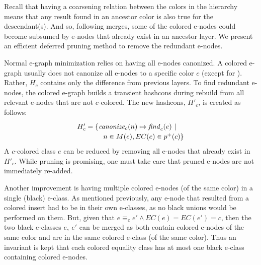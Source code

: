 Recall that having a coarsening relation between the colors in the hierarchy means that any result found in an ancestor color is also true for the descendant(s).
And so, following merges, some of the colored e-nodes could become subsumed by e-nodes that already exist in an ancestor layer.
We present an efficient deferred pruning method to remove the redundant e-nodes.

Normal e-graph minimization relies on having all e-nodes canonized.
A colored e-graph usually does not canonize all e-nodes to a specific color $c$ (except for \croot). 
Rather, $H_c$ contains only the difference from previous layers. 
To find redundant e-nodes, the colored e-graph  builds a transient hashcons during rebuild from all relevant e-nodes that are not $c$-colored.
The new hashcons, $H'_c$, is created as follows:
\[
\renewcommand\arraystretch{1.2}
\begin{array}{l@{}l}
H'_c = \{& \mathit{canonize}_c(n) \mapsto \tfind_c(e) ~|~ \\
& ~~n \in M(e), EC(e) \in p^+(c) \}
\end{array}
\]
A $c$-colored class $e$ can be reduced by removing all e-nodes that already exist in $H'_c$.
While pruning is promising, one must take care that pruned e-nodes are not immediately re-added.

Another improvement is having multiple colored e-nodes (of the same color) in a single (black) e-class. 
As mentioned previously, any e-node that resulted from a colored insert had to be in their own e-classes, as no black unions would be performed on them.
But, given that $e \equiv_c e' \land EC(e) = EC(e') = c$, then the two black e-classes $e,~e'$ can be merged as both contain colored e-nodes of the same color and are in the same colored e-class (of the same color).
Thus an invariant is kept that each colored equality class has at most one black e-class containing colored e-nodes.

